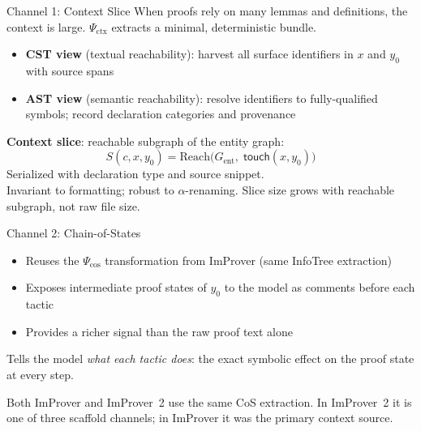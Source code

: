 \begin{frame}{Channel 1: Context Slice}
\vspace{0.4em}
When proofs rely on many lemmas and definitions, the context is large. $\Psi_{\mathrm{ctx}}$ extracts a minimal, deterministic bundle.
\vspace{0.4em}
\begin{itemize}\setlength{\itemsep}{6pt}
  \item \textbf{CST view} (textual reachability): harvest all surface identifiers in $x$ and $y_0$ with source spans
  \item \textbf{AST view} (semantic reachability): resolve identifiers to fully-qualified symbols; record declaration categories and provenance
\end{itemize}
\vspace{0.3em}

\textbf{Context slice}: reachable subgraph of the entity graph:
\[
  S(c,x,y_0) = \mathrm{Reach}\bigl(G_{\mathrm{ent}},\; \mathsf{touch}(x,y_0)\bigr)
\]
Serialized with declaration type and source snippet.\\[0.3em]
\small Invariant to formatting; robust to $\alpha$-renaming. Slice size grows with reachable subgraph, not raw file size.
\end{frame}

\begin{frame}{Channel 2: Chain-of-States}
\vspace{0.8em}
\begin{itemize}\setlength{\itemsep}{10pt}
  \item Reuses the $\Psi_{\mathrm{cos}}$ transformation from ImProver (same InfoTree extraction)
  \item Exposes intermediate proof states of $y_0$ to the model as comments before each tactic
  \item Provides a richer signal than the raw proof text alone
\end{itemize}
\vspace{0.8em}
\begin{exampleblock}{}
  Tells the model \emph{what each tactic does}: the exact symbolic effect on the proof state at every step.
\end{exampleblock}
\vspace{0.5em}
\small Both ImProver and ImProver~2 use the same CoS extraction. In ImProver~2 it is one of three scaffold channels; in ImProver it was the primary context source.
\end{frame}

